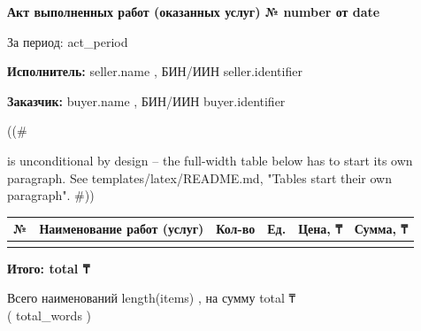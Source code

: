 \documentclass[a4paper,10pt]{article}
\newcommand{\field}[1]{\textbf{#1}}
\begin{document}
\begin{center}\Large\bfseries Акт выполненных работ (оказанных услуг) № {{ number }} от {{ date }}\end{center}
\vspace{4mm}
\noindent За период: {{ act_period }}\par
\vspace{2mm}
\noindent\field{Исполнитель:} {{ seller.name }}, БИН/ИИН {{ seller.identifier }}\par
{%
{%
\vspace{2mm}
\noindent\field{Заказчик:} {{ buyer.name }}, БИН/ИИН {{ buyer.identifier }}\par
{%
{%
((# \par is unconditional by design -- the full-width table below has to start its
    own paragraph. See templates/latex/README.md, "Tables start their own paragraph". #))\par\vspace{4mm}
\noindent\begin{tabularx}{\textwidth}{@{}c X r r r r@{}}
\toprule
№ & Наименование работ (услуг) & Кол-во & Ед. & Цена, ₸ & Сумма, ₸ \\
\midrule
{%
{%
\bottomrule
\end{tabularx}
\vspace{3mm}
{%
\hfill\field{Итого: {{ total }} ₸}\par
\noindent Всего наименований {{ length(items) }}, на сумму {{ total }} ₸\\
({{ total_words }})
\vspace{6mm}
}}}}}
\end{document}
